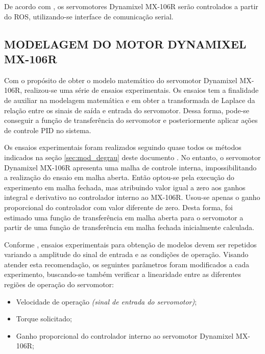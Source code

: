 \documentclass[12pt,oneside,a4paper, chapter=TITLE, section = TITLE, english, brazil]{abntex2}
\begin{document}
De acordo com , os servomotores Dynamixel MX-106R serão controlados a partir do ROS, utilizando-se interface de comunicação serial.

\subsection{MODELAGEM DO MOTOR DYNAMIXEL MX-106R} %

Com o propósito de obter o modelo matemático do servomotor Dynamixel MX-106R, realizou-se uma série de ensaios experimentais. Os ensaios tem a finalidade de auxiliar na modelagem matemática e em obter a transformada de Laplace da relação entre os sinais de saída e entrada do servomotor. Dessa forma, pode-se conseguir a função de transferência do servomotor e posteriormente aplicar ações de controle PID no sistema.

Os ensaios experimentais foram realizados seguindo quase todos os métodos indicados na seção \ref{sec:mod_degrau} deste documento \cite{astrom}. No entanto, o servomotor Dynamixel MX-106R apresenta uma malha de controle interna, impossibilitando a realização do ensaio em malha aberta. Então optou-se pela execução do experimento em malha fechada, mas atribuindo valor igual a zero aos ganhos integral e derivativo no controlador interno ao MX-106R. Usou-se apenas o ganho proporcional do controlador com valor diferente de zero. Desta forma, foi estimado uma função de transferência em malha aberta para o servomotor a partir de uma função de transferência em malha fechada inicialmente calculada.

Conforme , ensaios experimentais para obtenção de modelos devem ser repetidos variando a amplitude do sinal de entrada e as condições de operação. Visando atender esta recomendação, os seguintes parâmetros foram modificados a cada experimento, buscando-se também verificar a linearidade entre as diferentes regiões de operação do servomotor:

\begin{itemize}

\item Velocidade de operação \textit{(sinal de entrada do servomotor)};

\item Torque solicitado;

\item Ganho proporcional do controlador interno ao servomotor Dynamixel MX-106R;

\end{itemize}
\end{document}
